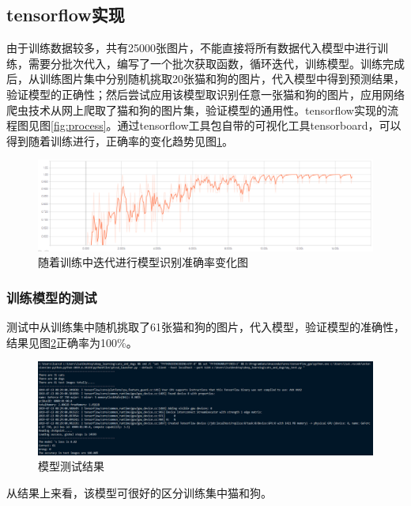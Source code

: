 \documentclass[a4paper,11pt]{ctexart}
\theoremstyle{break}
\theoremstyle{plain}
\begin{document}
\subsection{tensorflow实现}
由于训练数据较多，共有25000张图片，不能直接将所有数据代入模型中进行训练，需要分批次代入，编写了一个批次获取函数，循环迭代，训练模型。训练完成后，从训练图片集中分别随机挑取20张猫和狗的图片，代入模型中得到预测结果，验证模型的正确性；然后尝试应用该模型取识别任意一张猫和狗的图片，应用网络爬虫技术从网上爬取了猫和狗的图片集，验证模型的通用性。tensorflow实现的流程图见图\ref{fig:process}。通过tensorflow工具包自带的可视化工具tensorboard，可以得到随着训练进行，正确率的变化趋势见图\ref{fig:train}。
\begin{figure}[ht]
	\centering
	\includegraphics[width=\linewidth]{train.png}
	\caption{随着训练中迭代进行模型识别准确率变化图\label{fig:train}}
\end{figure}
\subsubsection{训练模型的测试}
测试中从训练集中随机挑取了61张猫和狗的图片，代入模型，验证模型的准确性，结果见图\ref{fig:test_min}正确率为100\%。
\begin{figure}[hb]
	\centering
	\includegraphics[width=\linewidth]{test_min_result.png}
	\caption{模型测试结果\label{fig:test_min}}
\end{figure}
从结果上来看，该模型可很好的区分训练集中猫和狗。
\end{document}

